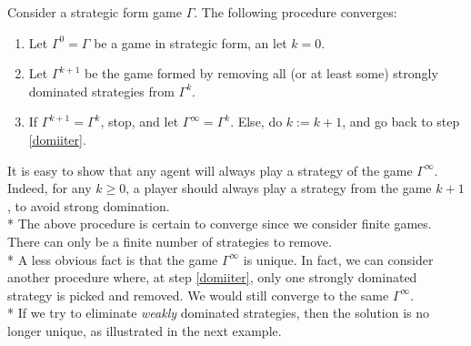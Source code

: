\begin{procedure}
Consider a strategic form game $\Gamma$. The following procedure converges:
\begin{enumerate}
\item Let $\Gamma^0 = \Gamma $ be a game in strategic form, an let $k = 0$.
\item Let $\Gamma^{k + 1}$ be the game formed by removing all (or at least some) strongly dominated strategies from $\Gamma^k$. \label{domiiter}
\item If $\Gamma^{k+1} = \Gamma^k$, stop, and let $\Gamma^\infty = \Gamma^k$. Else, do $k := k+1$, and go back to step \ref{domiiter}.
\end{enumerate}
\label{chap2:domioutproc} 
\end{procedure}

It is easy to show that any agent will always play a strategy of the game $\Gamma^{\infty}$. Indeed, for any $k \geq 0$, a player should always play a strategy from the game $k+1$, to avoid strong domination.\\*
The above procedure is certain to converge since we consider finite games. There can only be a finite number of strategies to remove. \\*
A less obvious fact is that the game $\Gamma^\infty$ is unique. In fact, we can consider another procedure where, at step \ref{domiiter}, only one strongly dominated strategy is picked and removed. We would still converge to the same $\Gamma^\infty$.\\* If we try to eliminate \emph{weakly} dominated strategies, then the solution is no longer unique, as illustrated in the next example.

